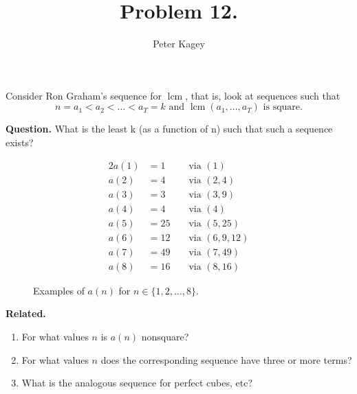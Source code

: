 \documentclass{article}
\newenvironment{question}{\begin{trivlist}\item[\textbf{Question.}]}{\end{trivlist}}
\newenvironment{related}{\begin{trivlist}\item[\textbf{Related.}]\end{trivlist}\begin{enumerate}}{\end{enumerate}}
\begin{document}
\title{Problem 12.}
\date{}
\author{Peter Kagey}
\maketitle
  Consider Ron Graham's sequence for $\operatorname{lcm}$, that is, look at sequences such that \[
    n = a_1 < a_2 < \hdots < a_T = k \text{ and } \operatorname{lcm}(a_1,\hdots,a_T) \text{ is square.}
  \]
\begin{question}
  What is the least k (as a function of n) such that such a sequence exists?
\end{question}
\begin{figure}[!h]
  \centering
  \begin{alignat*}{2}
  a(1) &= 1  &&\text{ via } (1)\\
  a(2) &= 4  &&\text{ via } (2, 4)\\
  a(3) &= 3  &&\text{ via } (3, 9)\\
  a(4) &= 4  &&\text{ via } (4)\\
  a(5) &= 25 &&\text{ via } (5, 25)\\
  a(6) &= 12 &&\text{ via } (6, 9, 12)\\
  a(7) &= 49 &&\text{ via } (7, 49)\\
  a(8) &= 16 &&\text{ via } (8, 16)
  \end{alignat*}
  \caption{
    Examples of $a(n)$ for $n \in \{1, 2,\hdots,8\}$.
  }
\end{figure}

\begin{related}
  \item For what values $n$ is $a(n)$ nonsquare?
  \item For what values $n$ does the corresponding sequence have three or more terms?
  \item What is the analogous sequence for perfect cubes, etc?
\end{related}
\end{document}
